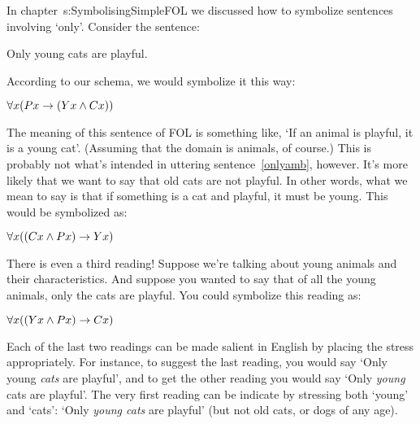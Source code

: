 In chapter~{s:SymbolisingSimpleFOL} we discussed how to symbolize sentences involving `only'. Consider the sentence:
\begin{earg}
	\item[\ex{onlyamb}] Only young cats are playful.
\end{earg}
According to our schema, we would symbolize it this way:
\begin{earg}
	\prem $\forall x({P}{x} \rightarrow ({Y}{x} \mathbin{\wedge} {C}{x}))$
\end{earg}
The meaning of this sentence of FOL is something like, `If an animal is playful, it is a young cat'. (Assuming that the domain is animals, of course.) This is probably not what's intended in uttering sentence~\ref{onlyamb}, however. It's more likely that we want to say that old cats are not playful. In other words, what we mean to say is that if something is a cat and playful, it must be young. This would be symbolized as:
\begin{earg}
	\prem $\forall x(({C}{x} \mathbin{\wedge} {P}{x}) \rightarrow {Y}{x})$
\end{earg}
There is even a third reading! Suppose we're talking about young animals and their characteristics. And suppose you wanted to say that of all the young animals, only the cats are playful. You could symbolize this reading as:
\begin{earg}
	\prem $\forall x(({Y}{x} \mathbin{\wedge} {P}{x}) \rightarrow {C}{x})$
\end{earg}
Each of the last two readings can be made salient in English by placing the stress appropriately. For instance, to suggest the last reading, you would say `Only young \emph{cats} are playful', and to get the other reading you would say `Only \emph{young} cats are playful'.  The very first reading can be indicate by stressing both `young' and `cats': `Only \emph{young cats} are playful' (but not old cats, or dogs of any age).

